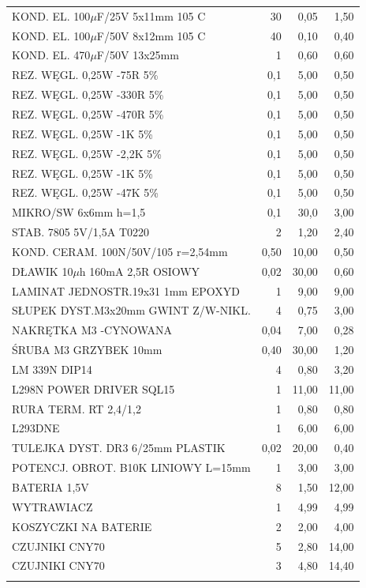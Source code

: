 \documentclass[11pt,a4paper]{article}
\begin{document}
\begin{longtable}{|l|r|r|r|}
  KOND. EL. 100$\mu$F/25V 5x11mm 105 C & 30 & 0,05 & 1,50 \\   
  KOND. EL. 100$\mu$F/50V 8x12mm 105 C & 40 & 0,10 & 0,40 \\ 
  KOND. EL. 470$\mu$F/50V 13x25mm & 1 & 0,60 & 0,60 \\ 
  REZ. WĘGL. 0,25W -75R 5\% & 0,1 & 5,00 & 0,50 \\
  REZ. WĘGL. 0,25W -330R 5\% & 0,1 & 5,00 & 0,50 \\
  REZ. WĘGL. 0,25W -470R 5\% & 0,1 & 5,00 & 0,50 \\
  REZ. WĘGL. 0,25W -1K 5\% & 0,1 & 5,00 & 0,50 \\
  REZ. WĘGL. 0,25W -2,2K 5\% & 0,1 & 5,00 & 0,50 \\
  REZ. WĘGL. 0,25W -1K 5\% & 0,1 & 5,00 & 0,50 \\
  REZ. WĘGL. 0,25W -47K 5\% & 0,1 & 5,00 & 0,50 \\
  MIKRO/SW 6x6mm h=1,5 & 0,1 & 30,0 & 3,00 \\
  STAB. 7805 5V/1,5A T0220 & 2 & 1,20 & 2,40 \\
  KOND. CERAM. 100N/50V/105 r=2,54mm & 0,50 & 10,00 & 0,50 \\
  DŁAWIK 10$\mu$h 160mA 2,5R OSIOWY & 0,02 & 30,00 & 0,60 \\
  LAMINAT JEDNOSTR.19x31 1mm EPOXYD & 1 & 9,00 & 9,00 \\
  SŁUPEK DYST.M3x20mm GWINT Z/W-NIKL. & 4 & 0,75 & 3,00 \\
  NAKRĘTKA M3 -CYNOWANA & 0,04 & 7,00 & 0,28 \\
  ŚRUBA M3 GRZYBEK 10mm & 0,40 & 30,00 & 1,20 \\
  LM 339N DIP14 & 4 & 0,80 & 3,20 \\
  L298N POWER DRIVER SQL15 & 1 & 11,00 & 11,00 \\
  RURA TERM. RT 2,4/1,2 & 1 & 0,80 & 0,80 \\
  L293DNE & 1 & 6,00 & 6,00 \\
  TULEJKA DYST. DR3 6/25mm PLASTIK & 0,02 & 20,00 & 0,40 \\
  POTENCJ. OBROT. B10K LINIOWY L=15mm & 1 & 3,00 & 3,00 \\
  BATERIA 1,5V & 8 & 1,50 & 12,00 \\
  WYTRAWIACZ & 1 & 4,99 & 4,99 \\
  KOSZYCZKI NA BATERIE & 2 & 2,00 & 4,00 \\      
  CZUJNIKI CNY70 & 5 & 2,80 & 14,00 \\ 
  CZUJNIKI CNY70 & 3 & 4,80 & 14,40 \\ 
   &  &  &  \\        
  \hline
\end{longtable}
\restoregeometry
\end{document}
